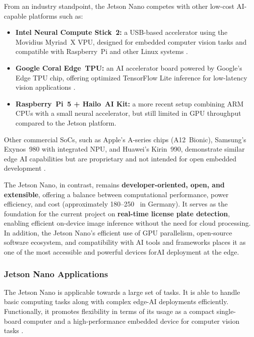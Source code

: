 \bigskip

From an industry standpoint, the Jetson Nano competes with other low-cost \ac{AI}-capable platforms such as:
\begin{itemize}
	\item \textbf{Intel Neural Compute Stick~2:} a \ac{USB}-based accelerator using the Movidius Myriad~X VPU, designed for embedded computer vision tasks and compatible with Raspberry~Pi and other Linux systems \cite{IntelStickDataSheet:2019}.
	\item \textbf{Google Coral Edge~\ac{TPU}:} an \ac{AI} accelerator board powered by Google's Edge \ac{TPU} chip, offering optimized TensorFlow Lite inference for low-latency vision applications \cite{GoogleCoral:2019, Vincent:2018}.
	\item \textbf{Raspberry~Pi~5 + Hailo~AI Kit:} a more recent setup combining ARM CPUs with a small neural accelerator, but still limited in \ac{GPU} throughput compared to the Jetson platform.
\end{itemize}

\bigskip

Other commercial \ac{SoC}s, such as Apple’s A-series chips (A12~Bionic), Samsung’s Exynos~980 with integrated NPU, and Huawei’s Kirin~990, demonstrate similar edge \ac{AI} capabilities but are proprietary and not intended for open embedded development \cite{SamsungExynos980:2020,HuaweiKirin990:2020}. 

\bigskip
The Jetson Nano, in contrast, remains \textbf{developer-oriented, open, and extensible}, offering a balance between computational performance, power efficiency, and cost (approximately 180–250~\texteuro{} in Germany). 
It serves as the foundation for the current project on \textbf{real-time license plate detection}, enabling efficient on-device image inference without the need for cloud processing. In addition, the Jetson Nano’s efficient use of \ac{GPU} parallelism, open-source software ecosystem, and compatibility with \ac{AI} tools and frameworks places it as one of the most accessible and powerful devices for\ac{AI} deployment at the edge.

\newpage
\subsubsection{Jetson Nano Applications}
\label{subsec:applications}

The Jetson Nano is applicable towards a large set of tasks. It is able to handle basic computing tasks along with complex edge-\ac{AI} deployments efficiently. 
Functionally, it promotes flexibility in terms of its usage as a compact single-board computer and a high-performance embedded device for computer vision tasks \cite{Kurniawan:2021, JetsonProjects:2020}. 

